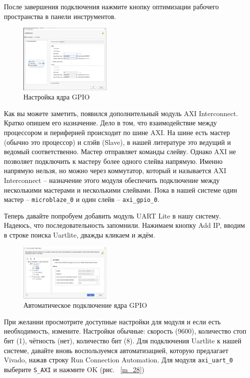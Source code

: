 \documentclass[a4paper,oneside ,10pt]{extreport}
\begin{document}
После завершения подключения нажмите кнопку оптимизации рабочего 
пространства в панели инструментов.

\begin{figure}[!ht]
	\centering
	\includegraphics[width=0.4\textwidth]{image/m_22.png}
	\caption{Настройка ядра GPIO}
	\label{m_22}
\end{figure}

Как вы можете заметить, появился дополнительный модуль 
AXI Interconnect. Кратко опишем его назначение. Дело в том, что 
взаимодействие между процессором и периферией происходит по шине AXI. 
На шине есть мастер (обычно это процессор) и слэйв (Slave), в 
нашей литературе это ведущий и ведомый соответственно. Мастер отправляет 
команды слейву. Однако AXI не позволяет подключить к мастеру более одного 
слейва напрямую. Именно напрямую нельзя, но можно через коммутатор, который и 
называется AXI Interconnect – назначение этого модуля обеспечить подключение 
между несколькими мастерами и несколькими слейвами. Пока в нашей системе 
один мастер –  \verb|microblaze_0| и один слейв –  \verb|axi_gpio_0|. 

Теперь давайте попробуем добавить модуль UART Lite в нашу систему.
Надеюсь, что последовательность запомнили. Нажимаем кнопку Add IP, вводим 
в строке поиска Uartlite, дважды кликаем и ждём. 

\begin{figure}[!ht]
	\centering
	\includegraphics[width=0.4\textwidth]{image/m_24.png}
	\caption{Автоматическое подключение ядра GPIO}
	\label{m_24}
\end{figure}

При желании просмотрите доступные настройки для модуля и если есть 
необходимость, измените. Настройки обычные: скорость (9600), количество стоп
бит (1), чётность (нет), количество бит (8).
Для подключения Uartlite к нашей системе, давайте вновь воспользуемся 
автоматизацией, которую предлагает Vivado, нажав строку Run Connection
Automation. Для модуля  \verb|axi_uart_0| выберите  \verb|S_AXI| и нажмите OK (рис. ~\ref{m_28})
\end{document}
